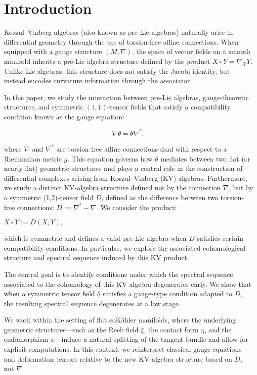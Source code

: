 
\section{Introduction}
Koszul–Vinberg algebras (also known as pre-Lie algebras) naturally arise in differential geometry through the use of torsion-free affine connections. When equipped with a gauge structure $(M, \nabla)$, the space of vector fields on a smooth manifold inherits a pre-Lie algebra structure defined by the product $X \circ Y = \nabla_X Y$. Unlike Lie algebras, this structure does not satisfy the Jacobi identity, but instead encodes curvature information through the associator.

In this paper, we study the interaction between pre-Lie algebras, gauge-theoretic structures, and symmetric $(1,1)$-tensor fields that satisfy a compatibility condition known as the gauge equation:

$$
\nabla \theta = \theta \nabla^*,
$$

where $\nabla$ and $\nabla^*$ are torsion-free affine connections dual with respect to a Riemannian metric $g$. This equation governs how $\theta$ mediates between two flat (or nearly flat) geometric structures and plays a central role in the construction of differential complexes arising from Koszul–Vinberg (KV) algebras. Furthermore, we study a distinct KV-algebra structure defined not by the connection $\nabla$, but by a symmetric (1,2)-tensor field $D$, defined as the difference between two torsion-free connections: $D := \nabla^* - \nabla$. We consider the product:

$X \circ Y := D(X, Y),$

which is symmetric and defines a valid pre-Lie algebra when $D$ satisfies certain compatibility conditions. In particular, we explore the associated cohomological structure and spectral sequence induced by this KV product.

The central goal is to identify conditions under which the spectral sequence associated to the cohomology of this KV algebra degenerates early. We show that when a symmetric tensor field $\theta$ satisfies a gauge-type condition adapted to $D$, the resulting spectral sequence degenerates at a low stage.

We work within the setting of flat coKähler manifolds, where the underlying geometric structures—such as the Reeb field $\xi$, the contact form $\eta$, and the endomorphism $\phi$—induce a natural splitting of the tangent bundle and allow for explicit computations. In this context, we reinterpret classical gauge equations and deformation tensors relative to the new KV-algebra structure based on $D$, not $\nabla$.

